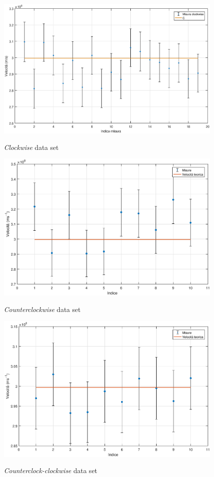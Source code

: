 \documentclass[a4paper,11pt]{article}
\begin{document}
	\begin{figure}
		\centering
		\caption{\emph{Clockwise} data set}
		\includegraphics[width=.98\textwidth]{Clockwiseplot}
		\label{fig:clockwiseplot}
	\end{figure}
	

	\begin{figure}
		\centering
		\caption{\emph{Counterclockwise} data set}
		\includegraphics[width=.98\textwidth]{Counterclockwiseplot}
		\label{fig:counterclockwiseplot}
	\end{figure}
	
	\begin{figure}
		\centering
		\caption{\emph{Counterclock-clockwise} data set}
		\includegraphics[width=.98\textwidth]{Clock-anticlockplot}
		\label{fig:clock-anticlockplot}
	\end{figure}
\end{document}
